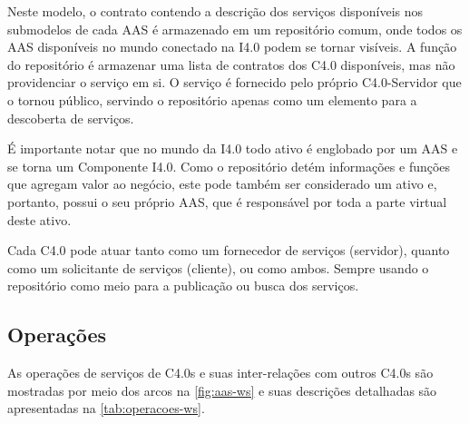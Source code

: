 Neste modelo, o contrato contendo a descrição dos serviços disponíveis nos submodelos de cada AAS é armazenado em um repositório comum, onde todos os AAS disponíveis no mundo conectado na I4.0 podem se tornar visíveis. A função do repositório é armazenar uma lista de contratos dos C4.0 disponíveis, mas não providenciar o serviço em si. O serviço é fornecido pelo próprio C4.0-Servidor que o tornou público, servindo o repositório apenas como um elemento para a descoberta de serviços.

É importante notar que no mundo da I4.0 todo ativo é englobado por um AAS e se torna um Componente I4.0. Como o repositório detém informações e funções que agregam valor ao negócio, este pode também ser considerado um ativo e, portanto, possui o seu próprio AAS, que é responsável por toda a parte virtual deste ativo.

Cada C4.0 pode atuar tanto como um fornecedor de serviços (servidor), quanto como um solicitante de serviços (cliente), ou como ambos. Sempre usando o repositório como meio para a publicação ou busca dos serviços.

\subsection{Operações}

As operações de serviços de C4.0s e suas inter-relações com outros C4.0s são mostradas por meio dos arcos na \autoref{fig:aas-ws} e suas descrições detalhadas são apresentadas na \autoref{tab:operacoes-ws}.

